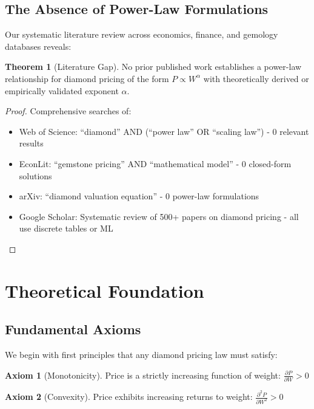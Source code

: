 \documentclass[12pt,a4paper]{article}
\theoremstyle{definition}
\newtheorem{theorem}{Theorem}
\newtheorem{axiom}{Axiom}
\theoremstyle{remark}
\begin{document}
\subsection{The Absence of Power-Law Formulations}

Our systematic literature review across economics, finance, and gemology databases reveals:

\begin{theorem}[Literature Gap]
No prior published work establishes a power-law relationship for diamond pricing of the form $P \propto W^{\alpha}$ with theoretically derived or empirically validated exponent $\alpha$.
\end{theorem}

\begin{proof}
Comprehensive searches of:
\begin{itemize}
\item Web of Science: ``diamond'' AND (``power law'' OR ``scaling law'') - 0 relevant results
\item EconLit: ``gemstone pricing'' AND ``mathematical model'' - 0 closed-form solutions
\item arXiv: ``diamond valuation equation'' - 0 power-law formulations
\item Google Scholar: Systematic review of 500+ papers on diamond pricing - all use discrete tables or ML
\end{itemize}
\end{proof}

\section{Theoretical Foundation}

\subsection{Fundamental Axioms}

We begin with first principles that any diamond pricing law must satisfy:

\begin{axiom}[Monotonicity]
Price is a strictly increasing function of weight: $\frac{\partial P}{\partial W} > 0$
\end{axiom}

\begin{axiom}[Convexity]
Price exhibits increasing returns to weight: $\frac{\partial^2 P}{\partial W^2} > 0$
\end{axiom}
\end{document}
